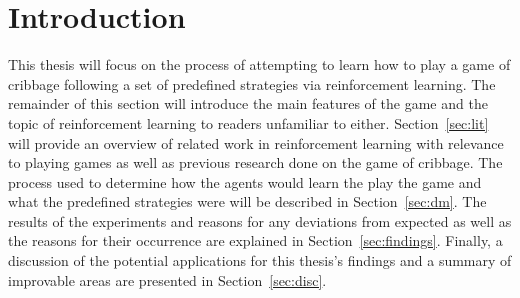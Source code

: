 \section{Introduction}
\label{sec:intro}


This thesis will focus on the process of attempting to learn how to play a game
of cribbage
following a set of predefined strategies
via reinforcement learning.
%
The remainder of this section will introduce the main features
of the game and the topic of reinforcement learning to readers unfamiliar to
either.
%
Section~\ref{sec:lit} will provide an overview of related work in reinforcement
learning with relevance to playing games
as well as previous research done on the game of cribbage.
%
The process used to determine how the agents would learn the play the game
and what the predefined strategies were will be described in
Section~\ref{sec:dm}.
%
The results of the experiments and reasons for any deviations from expected
as well as the reasons for their occurrence
are explained in Section~\ref{sec:findings}.
%
Finally,
a discussion of the potential applications for this thesis's findings and
a summary of improvable areas are presented in Section~\ref{sec:disc}.






